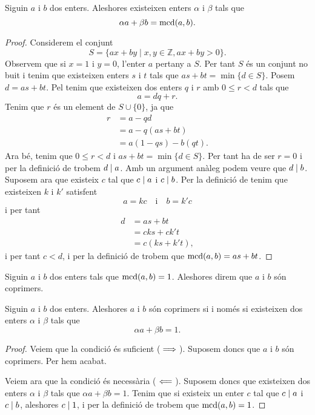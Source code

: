 \documentclass[../../Main.tex]{subfiles}
\begin{document}
	\begin{theorem}
		\label{thm:identitat de Bézout}
		Siguin \(a\) i \(b\) dos enters. Aleshores existeixen enters \(\alpha\) i \(\beta\) tals que
		\[\alpha a+\beta b=\operatorname{mcd}(a,b).\]
		\begin{proof}
			Considerem el conjunt
			\[S=\{ax+by\mid x,y\in\mathbb{Z}, ax+by>0\}.\]
			Observem que si \(x=1\) i \(y=0\), l'enter \(a\) pertany a \(S\). Per tant \(S\) és un conjunt no buit i tenim que existeixen enters \(s\) i \(t\) tals que \(as+bt=\min\{d\in S\}\). Posem \(d=as+bt\). Pel  tenim que existeixen dos enters \(q\) i \(r\) amb \(0\leq r<d\) tals que
			\[a=dq+r.\]
			Tenim que \(r\) és un element de \(S\cup\{0\}\), ja que
			\begin{align*}
			r&=a-qd\\
			&=a-q(as+bt)\\
			&=a(1-qs)-b(qt).
			\end{align*}
			Ara bé, tenim que \(0\leq r<d\) i \(as+bt=\min\{d\in S\}\). Per tant ha de ser \(r=0\) i per la definició de  trobem \(d\mathrel{|} a\). Amb un argument anàleg podem veure que \(d\mathrel{|} b\). Suposem ara que existeix \(c\) tal que \(c\mathrel{|} a\) i \(c\mathrel{|} b\). Per la definició de  tenim que existeixen \(k\) i \(k'\) satisfent
			\[a=kc\quad\text{i}\quad b=k'c\]
			i per tant
			\begin{align*}
			d&=as+bt\\
			&=cks+ck't\\
			&=c(ks+k't),
			\end{align*}
			i per tant \(c<d\), i per la definició de  trobem que \(\operatorname{mcd}(a,b)=as+bt\).
		\end{proof}
	\end{theorem}
	\begin{definition}[Coprimers]
		\label{def:coprimers}
		Siguin \(a\) i \(b\) dos enters tals que \(\operatorname{mcd}(a,b)=1\). Aleshores direm que \(a\) i \(b\) són coprimers.
	\end{definition}
	\begin{theorem}
		\label{thm:condició equivalent a coprimers per Bézout}
		Siguin \(a\) i \(b\) dos enters. Aleshores \(a\) i \(b\) són coprimers si i només si existeixen dos enters \(\alpha\) i \(\beta\) tals que
		\[\alpha a+\beta b=1.\]
		\begin{proof}
			Veiem que la condició és suficient (\(\implies\)). Suposem doncs que \(a\) i \(b\) són coprimers. Per  hem acabat.
			
			Veiem ara que la condició és necessària (\(\impliedby\)). Suposem doncs que existeixen dos enters \(\alpha\) i \(\beta\) tals que \(\alpha a+\beta b=1\). Tenim que si existeix un enter \(c\) tal que \(c\mathrel{|} a\) i \(c\mathrel{|} b\), aleshores \(c\mathrel{|} 1\), i per la definició de  trobem que \(\operatorname{mcd}(a,b)=1\).
		\end{proof}
	\end{theorem}
\end{document}
